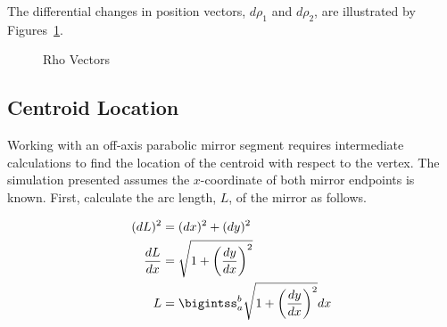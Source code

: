 The differential changes in position vectors, $d\rho_1$ and $d\rho_2$, are illustrated by Figures~\ref{drho12}.

\begin{figure}	%
 \centering
 \caption{Rho Vectors}
 \label{drho12}
\end{figure}

\subsection*{Centroid Location}

Working with an off-axis parabolic mirror segment requires intermediate calculations to find the location of the centroid with respect to the vertex. The simulation presented assumes the $x$-coordinate of both mirror endpoints is known. First, calculate the arc length, $L$, of the mirror as follows.

\begin{equation}
\label{eq:arclength}
\centering
\begin{aligned}
	(dL)^2 &= (dx)^2 + (dy)^2 \\
	\frac{dL}{dx} &= \sqrt{1+\left(\frac{dy}{dx}\right)^2} \\
	L &= \bigintss_a^b \sqrt{1+\left(\frac{dy}{dx}\right)^2}dx
\end{aligned}
\end{equation}\

